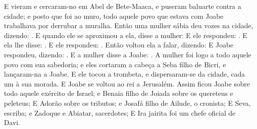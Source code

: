 {  E vieram e cercaram-no em Abel de Bete-Maaca, e puseram baluarte contra a cidade; e posto que foi ao muro, todo aquele povo que estava com Joabe trabalhava por derrubar a muralha.
  Então uma mulher sábia deu vozes na cidade, dizendo: . %
  E quando ele se aproximou a ela, disse a mulher:  E ele respondeu: . E ela lhe disse: . E ele respondeu: .
  Então voltou ela a falar, dizendo: 
  E Joabe respondeu, dizendo: . E a mulher disse a Joabe: .
  A mulher foi logo a todo aquele povo com sua sabedoria; e eles cortaram a cabeça a Seba filho de Bicri, e lançaram-na a Joabe. E ele tocou a trombeta, e dispersaram-se da cidade, cada um à sua morada. E Joabe se voltou ao rei a Jerusalém.
  Assim ficou Joabe sobre todo aquele exército de Israel; e Benaia filho de Joiada sobre os quereteus e peleteus;
  E Adorão sobre os tributos; e Josafá filho de Ailude, o cronista;
  E Seva, escriba; e Zadoque e Abiatar, sacerdotes;
  E Ira jairita foi um chefe oficial de Davi.
\par }

